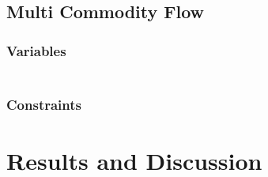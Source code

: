 \documentclass{article}
\begin{document}
\subsection{Multi Commodity Flow}
\subsubsection{Variables}
\begin{eqnarray}
\end{eqnarray}
\subsubsection{Constraints}

\section{Results and Discussion}

\begin{comment}
Create a short document (preferably in LaTeX) of about 3
pages containing:
* Problem description
* SCF, MCF, and MTZ formulations, and descriptions of used
variables and constraints
* Result table comparing all 3 formulations, including
objective function values, running times, numbers of branch-and-bound nodes
* Short interpretation of results

TODO: SCF, MCF formulations
TODO: Bench results, bench machine specs,
      benching method (repetitions, min of 5? 10?)
TODO: Discussion
\end{comment}
\end{document}
